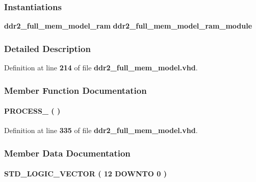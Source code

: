 \subsubsection*{Instantiations}
 \begin{DoxyCompactItemize}
\item 
{\bf ddr2\+\_\+full\+\_\+mem\+\_\+model\+\_\+ram}  {\bfseries ddr2\+\_\+full\+\_\+mem\+\_\+model\+\_\+ram\+\_\+module}   
\end{DoxyCompactItemize}


\subsubsection{Detailed Description}


Definition at line {\bf 214} of file {\bf ddr2\+\_\+full\+\_\+mem\+\_\+model.\+vhd}.



\subsubsection{Member Function Documentation}
\paragraph[{P\+R\+O\+C\+E\+S\+S\+\_\+93}]{\setlength{\rightskip}{0pt plus 5cm} {\bfseries \textcolor{vhdlchar}{ }} P\+R\+O\+C\+E\+S\+S\+\_ ( ) \hspace{0.3cm}{\ttfamily [Process]}}\label{classddr2__full__mem__model_1_1europa_acdbcba262f1f041279f3dc1b5707378f}


Definition at line {\bf 335} of file {\bf ddr2\+\_\+full\+\_\+mem\+\_\+model.\+vhd}.



\subsubsection{Member Data Documentation}
\paragraph[{a}]{ {\bfseries \textcolor{comment}{S\+T\+D\+\_\+\+L\+O\+G\+I\+C\+\_\+\+V\+E\+C\+T\+OR}\textcolor{vhdlchar}{ }\textcolor{vhdlchar}{(}\textcolor{vhdlchar}{ }\textcolor{vhdlchar}{ } \textcolor{vhdldigit}{12} \textcolor{vhdlchar}{ }\textcolor{keywordflow}{D\+O\+W\+N\+TO}\textcolor{vhdlchar}{ }\textcolor{vhdlchar}{ } \textcolor{vhdldigit}{0} \textcolor{vhdlchar}{ }\textcolor{vhdlchar}{)}\textcolor{vhdlchar}{ }} \hspace{0.3cm}{\ttfamily [Signal]}}\label{classddr2__full__mem__model_1_1europa_a5331278f17ffd4ff7493b6aa8b514825}


